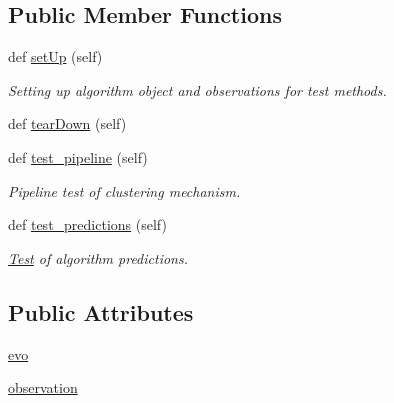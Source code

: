 \subsection*{Public Member Functions}
\begin{DoxyCompactItemize}
\item 
def \hyperlink{classStreamClusteringAlgorithms_1_1evoStream_1_1v1_1_1Tests_1_1EvoStreamv1Test_1_1Test_a417ff4abae3adcea11c96540b55cebaa}{set\+Up} (self)
\begin{DoxyCompactList}\small\item\em Setting up algorithm object and observations for test methods. \end{DoxyCompactList}\item 
def \hyperlink{classStreamClusteringAlgorithms_1_1evoStream_1_1v1_1_1Tests_1_1EvoStreamv1Test_1_1Test_a6687b34b5280ecf25865914f7e5b4b35}{tear\+Down} (self)
\item 
def \hyperlink{classStreamClusteringAlgorithms_1_1evoStream_1_1v1_1_1Tests_1_1EvoStreamv1Test_1_1Test_a083882949698c86a856604a5467d0e35}{test\+\_\+pipeline} (self)
\begin{DoxyCompactList}\small\item\em Pipeline test of clustering mechanism. \end{DoxyCompactList}\item 
def \hyperlink{classStreamClusteringAlgorithms_1_1evoStream_1_1v1_1_1Tests_1_1EvoStreamv1Test_1_1Test_a1e1c9b48bef84a01ede43b88e1a9103a}{test\+\_\+predictions} (self)
\begin{DoxyCompactList}\small\item\em \hyperlink{classStreamClusteringAlgorithms_1_1evoStream_1_1v1_1_1Tests_1_1EvoStreamv1Test_1_1Test}{Test} of algorithm predictions. \end{DoxyCompactList}\end{DoxyCompactItemize}
\subsection*{Public Attributes}
\begin{DoxyCompactItemize}
\item 
\hyperlink{classStreamClusteringAlgorithms_1_1evoStream_1_1v1_1_1Tests_1_1EvoStreamv1Test_1_1Test_a9db3219943754c41bcab6ed2bb8f8b9b}{evo}
\item 
\hyperlink{classStreamClusteringAlgorithms_1_1evoStream_1_1v1_1_1Tests_1_1EvoStreamv1Test_1_1Test_a4c28200e5e876b8fde116193e71c443b}{observation}
\end{DoxyCompactItemize}


